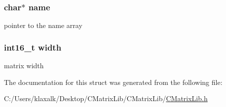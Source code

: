 \subsubsection[{name}]{\setlength{\rightskip}{0pt plus 5cm}char$\ast$ name}\label{structmatrix__float_a5ac083a645d964373f022d03df4849c8}
pointer to the name array \hypertarget{structmatrix__float_ae0ffb42440f0305b6d22a1c6106b6e6f}{}
\subsubsection[{width}]{\setlength{\rightskip}{0pt plus 5cm}int16\+\_\+t width}\label{structmatrix__float_ae0ffb42440f0305b6d22a1c6106b6e6f}
matrix width 

The documentation for this struct was generated from the following file\+:\begin{DoxyCompactItemize}
\item 
C\+:/\+Users/klaxalk/\+Desktop/\+C\+Matrix\+Lib/\+C\+Matrix\+Lib/\hyperlink{_c_matrix_lib_8h}{C\+Matrix\+Lib.\+h}\end{DoxyCompactItemize}

